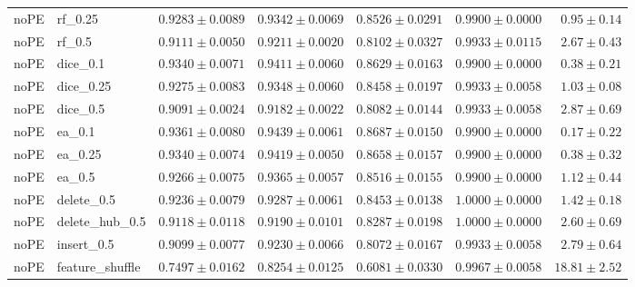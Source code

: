 \documentclass[UTF8,a4paper,11pt,fontset=fandol]{ctexart}
\begin{document}
{\begin{longtable}{llrrrrr}
noPE & rf\_0.25 & $0.9283\pm0.0089$ & $0.9342\pm0.0069$ & $0.8526\pm0.0291$ & $0.9900\pm0.0000$ & $0.95\pm0.14$ \\
noPE & rf\_0.5 & $0.9111\pm0.0050$ & $0.9211\pm0.0020$ & $0.8102\pm0.0327$ & $0.9933\pm0.0115$ & $2.67\pm0.43$ \\
noPE & dice\_0.1 & $0.9340\pm0.0071$ & $0.9411\pm0.0060$ & $0.8629\pm0.0163$ & $0.9900\pm0.0000$ & $0.38\pm0.21$ \\
noPE & dice\_0.25 & $0.9275\pm0.0083$ & $0.9348\pm0.0060$ & $0.8458\pm0.0197$ & $0.9933\pm0.0058$ & $1.03\pm0.08$ \\
noPE & dice\_0.5 & $0.9091\pm0.0024$ & $0.9182\pm0.0022$ & $0.8082\pm0.0144$ & $0.9933\pm0.0058$ & $2.87\pm0.69$ \\
noPE & ea\_0.1 & $0.9361\pm0.0080$ & $0.9439\pm0.0061$ & $0.8687\pm0.0150$ & $0.9900\pm0.0000$ & $0.17\pm0.22$ \\
noPE & ea\_0.25 & $0.9340\pm0.0074$ & $0.9419\pm0.0050$ & $0.8658\pm0.0157$ & $0.9900\pm0.0000$ & $0.38\pm0.32$ \\
noPE & ea\_0.5 & $0.9266\pm0.0075$ & $0.9365\pm0.0057$ & $0.8516\pm0.0155$ & $0.9900\pm0.0000$ & $1.12\pm0.44$ \\
noPE & delete\_0.5 & $0.9236\pm0.0079$ & $0.9287\pm0.0061$ & $0.8453\pm0.0138$ & $1.0000\pm0.0000$ & $1.42\pm0.18$ \\
noPE & delete\_hub\_0.5 & $0.9118\pm0.0118$ & $0.9190\pm0.0101$ & $0.8287\pm0.0198$ & $1.0000\pm0.0000$ & $2.60\pm0.69$ \\
noPE & insert\_0.5 & $0.9099\pm0.0077$ & $0.9230\pm0.0066$ & $0.8072\pm0.0167$ & $0.9933\pm0.0058$ & $2.79\pm0.64$ \\
noPE & feature\_shuffle & $0.7497\pm0.0162$ & $0.8254\pm0.0125$ & $0.6081\pm0.0330$ & $0.9967\pm0.0058$ & $18.81\pm2.52$ \\
\end{longtable}
}
\end{document}
